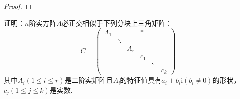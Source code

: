 \documentclass[../../main.tex]{subfiles}%
\begin{document}
\begin{proof}
\end{proof}

\begin{proposition}\label{proposition:两个半正定阵可同时合同对角化7}
证明：\(n\)阶实方阵\(A\)必正交相似于下列分块上三角矩阵：
\[
C = 
\begin{pmatrix}
A_1 & & & * \\
& \ddots & & \\
& & A_r & \\
& & & c_1 & \\
& & & & \ddots & \\
& & & & & c_k
\end{pmatrix}
\]
其中\(A_i(1\leqslant  i\leqslant  r)\)是二阶实矩阵且\(A_i\)的特征值具有\(a_i\pm b_i\mathrm{i}(b_i\neq0)\)的形状，\(c_j(1\leqslant  j\leqslant  k)\)是实数.
\end{proposition}
\end{document}
